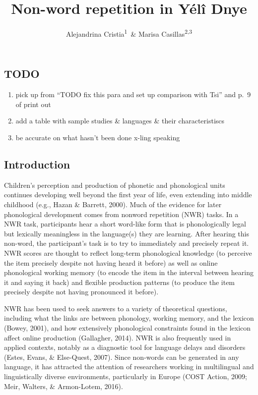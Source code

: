 \documentclass[english,,man,floatsintext]{apa6}
\author{Alejandrina Cristia\textsuperscript{1}\ \& Marisa Casillas\textsuperscript{2,3}}
\affiliation{
\vspace{0.5cm}
\textsuperscript{1} Laboratoire de Sciences Cognitives et de Psycholinguistique, Département d'Etudes cognitives, ENS, EHESS, CNRS, PSL University\\\textsuperscript{2} Max Planck Institute for Psycholinguistics\\\textsuperscript{3} University of Chicago}
\title{Non-word repetition in Yélî Dnye}
\date{}
\providecommand{\tightlist}{%
  \setlength{\itemsep}{0pt}\setlength{\parskip}{0pt}}
\begin{document}
\maketitle

\hypertarget{todo}{%
\subsection{TODO}\label{todo}}

\begin{enumerate}
\def\labelenumi{\arabic{enumi}.}
\tightlist
\item
  pick up from \enquote{TODO fix this para and set up comparison with Tsi} and p.~9 of print out
\item
  add a table with sample studies \& languages \& their characteristiscs
\item
  be accurate on what hasn't been done x-ling speaking
\end{enumerate}

\hypertarget{introduction}{%
\subsection{Introduction}\label{introduction}}

Children's perception and production of phonetic and phonological units continues developing well beyond the first year of life, even extending into middle childhood (e.g., Hazan \& Barrett, 2000). Much of the evidence for later phonological development comes from nonword repetition (NWR) tasks. In a NWR task, participants hear a short word-like form that is phonologically legal but lexically meaningless in the language(s) they are learning. After hearing this non-word, the participant's task is to try to immediately and precisely repeat it. NWR scores are thought to reflect long-term phonological knowledge (to perceive the item precisely despite not having heard it before) as well as online phonological working memory (to encode the item in the interval between hearing it and saying it back) and flexible production patterns (to produce the item precisely despite not having pronounced it before).

NWR has been used to seek answers to a variety of theoretical questions, including what the links are between phonology, working memory, and the lexicon (Bowey, 2001), and how extensively phonological constraints found in the lexicon affect online production (Gallagher, 2014). NWR is also frequently used in applied contexts, notably as a diagnostic tool for language delays and disorders (Estes, Evans, \& Else-Quest, 2007). Since non-words can be generated in any language, it has attracted the attention of researchers working in multilingual and linguistically diverse environments, particularly in Europe (COST Action, 2009; Meir, Walters, \& Armon-Lotem, 2016).
\end{document}
